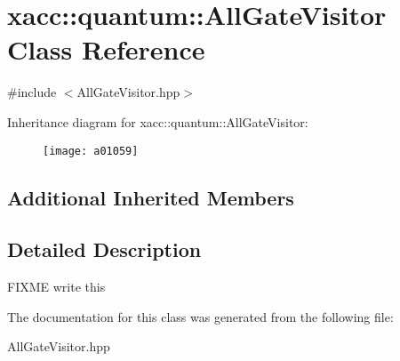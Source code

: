 \hypertarget{a01059}{}\section{xacc\+:\+:quantum\+:\+:All\+Gate\+Visitor Class Reference}
\label{a01059}


{\ttfamily \#include $<$All\+Gate\+Visitor.\+hpp$>$}

Inheritance diagram for xacc\+:\+:quantum\+:\+:All\+Gate\+Visitor\+:\begin{figure}[H]
\begin{center}
\leavevmode
\texttt{[image: a01059]}
\end{center}
\end{figure}
\subsection*{Additional Inherited Members}


\subsection{Detailed Description}
F\+I\+X\+ME write this 

The documentation for this class was generated from the following file\+:\begin{DoxyCompactItemize}
\item 
All\+Gate\+Visitor.\+hpp\end{DoxyCompactItemize}
